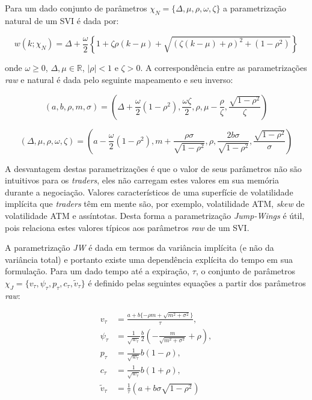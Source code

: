 \documentclass[]{book}
\theoremstyle{definition}
\theoremstyle{definition}
\theoremstyle{definition}
\theoremstyle{remark}
\begin{document}
Para um dado conjunto de parâmetros \(\chi_N=\{\Delta, \mu, \rho, \omega, \zeta\}\) a parametrização natural de um SVI é dada por:

\begin{equation}
w(k; \chi_N)=\Delta+\frac{\omega}{2}\left\lbrace 1+\zeta\rho(k-\mu)+\sqrt{(\zeta(k-\mu)+\rho)^2+(1-\rho^2)} \right\rbrace
\label{eq:svi-natural}
\end{equation}

onde \(\omega\geq 0\), \(\Delta, \mu \in \mathbb R\), \(|\rho|<1\) e \(\zeta>0\). A correspondência entre as parametrizações \emph{raw} e natural é dada pelo seguinte mapeamento e seu inverso:

\begin{equation}
(a, b, \rho, m, \sigma)=\left(\Delta+\frac{\omega}{2}(1-\rho^2), \frac{\omega\zeta}{2}, \rho, \mu-\frac{\rho}{\zeta}, \frac{\sqrt{1-\rho^2}}{\zeta}\right)
\label{eq:natural-to-raw}
\end{equation}

\begin{equation}
(\Delta, \mu, \rho, \omega, \zeta)=\left(a-\frac{\omega}{2}(1-\rho^2), m+\frac{\rho\sigma}{\sqrt{1-\rho^2}}, \rho, \frac{2b\sigma}{\sqrt{1-\rho^2}}, \frac{\sqrt{1-\rho^2}}{\sigma}\right)
\label{eq:raw-to-natural}
\end{equation}

A desvantagem destas parametrizações é que o valor de seus parâmetros não são intuitivos para os \emph{traders}, eles não carregam estes valores em sua memória durante a negociação. Valores característicos de uma superfície de volatilidade implícita que \emph{traders} têm em mente são, por exemplo, volatilidade ATM, \emph{skew} de volatilidade ATM e assíntotas. Desta forma a parametrização \emph{Jump-Wings} é útil, pois relaciona estes valores típicos aos parâmetros \emph{raw} de um SVI.

A parametrização \emph{JW} é dada em termos da variância implícita (e não da variância total) e portanto existe uma dependência explícita do tempo em sua formulação. Para um dado tempo até a expiração, \(\tau\), o conjunto de parâmetros \(\chi_{J}=\{v_\tau, \psi_\tau, p_\tau, c_\tau, \tilde v_\tau\}\) é definido pelas seguintes equações a partir dos parâmetros \emph{raw}:

\begin{align}
v_\tau&=\frac{a+b\{-\rho m + \sqrt{m^2+\sigma^2}\}}{\tau},\\
\psi_\tau&=\frac{1}{\sqrt{w_\tau}}\frac{b}{2}\left(-\frac{m}{\sqrt{m^2+\sigma^2}}+\rho\right),\\
p_\tau&=\frac{1}{\sqrt{w_\tau}}b(1-\rho),\\
c_\tau&=\frac{1}{\sqrt{w_\tau}}b(1+\rho),\\
\tilde v_\tau&=\frac{1}{\tau}\left(a+b\sigma\sqrt{1-\rho^2}\right)
\label{eq:raw-to-jw}
\end{align}
\end{document}
